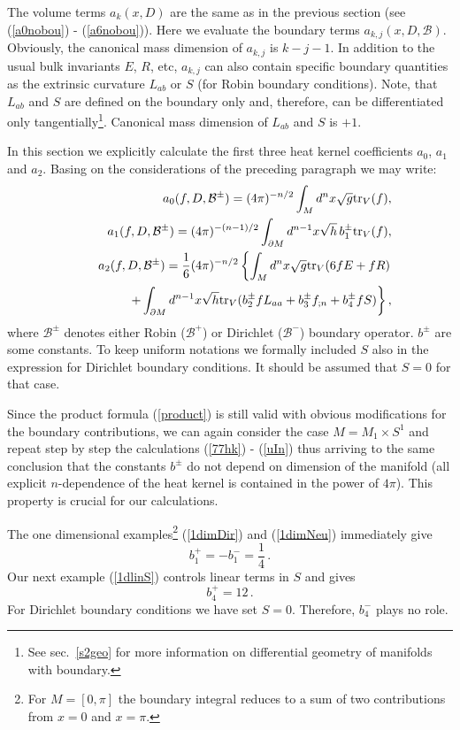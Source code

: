 The volume terms $a_k(x,D)$ are the same as in the previous section
(see (\ref{a0nobou}) - (\ref{a6nobou})). Here we evaluate the
boundary terms $a_{k,j}(x,D,\mathcal{B})$. Obviously, the canonical
mass dimension of $a_{k,j}$ is $k-j-1$. In addition to the usual bulk
invariants $E$, $R$, etc, $a_{k,j}$ can also contain specific boundary
quantities as the extrinsic curvature $L_{ab}$ or $S$ (for Robin
boundary conditions). Note, that $L_{ab}$ and $S$ are defined on the
boundary only and, therefore, can be differentiated only 
tangentially\footnote{See sec.\ \ref{s2geo} for more information on
differential geometry of manifolds with boundary.}. Canonical mass dimension
of $L_{ab}$ and $S$ is $+1$.

In this section we explicitly calculate the first three heat kernel
coefficients $a_0$, $a_1$ and $a_2$. Basing on the considerations of the
preceding paragraph we may write:
\begin{eqnarray}
&&a_0(f,D,\mathcal{ B}^\pm)=(4\pi)^{-n/2}\int_M d^nx\sqrt{g} {\rm tr}_V(f),\label{a0DN} \\
&&a_1(f,D,\mathcal{ B}^\pm)=(4\pi)^{-(n-1)/2}\int_{\partial M} d^{n-1}x\sqrt{h} \, b_1^\pm
     {\rm tr}_V ( f), \label{a1DN} \\
&&a_2(f,D,\mathcal{ B}^\pm)=\frac 16 (4\pi)^{-n/2}\left\{ \int_M d^nx\sqrt{g}
     {\rm tr}_V(6fE+fR) \right. \nonumber \\
&&\qquad\qquad \left. +\int_{\partial M} d^{n-1}x\sqrt{h} {\rm tr}_V(b_2^\pm fL_{ aa}
     +b_3^\pm f_{ ;n}+b_4^\pm fS)
     \right\} ,\label{a2DN}
\end{eqnarray}   
where $\mathcal{B}^\pm$ denotes either Robin ($\mathcal{B}^+$) or
Dirichlet ($\mathcal{B}^-$) boundary operator. $b^\pm$ are some
constants. To keep uniform notations we formally included $S$ also in the
expression for Dirichlet boundary conditions. It should be assumed
that $S=0$ for that case.

Since the product 
formula (\ref{product}) is still valid with obvious modifications
for the boundary contributions, we can again consider the
case $M=M_1\times S^1$ and repeat step by step the calculations
(\ref{77hk}) - (\ref{uIn}) thus arriving to the same conclusion that
the constants $b^\pm$ do not depend on dimension of the manifold
(all explicit $n$-dependence of the heat kernel is contained in the power
of $4\pi$). This property is crucial for our calculations.

The one dimensional examples\footnote{For $M=[0,\pi ]$ the boundary
integral reduces to a sum of two contributions from $x=0$ and $x=\pi$.}
(\ref{1dimDir}) and (\ref{1dimNeu}) immediately give
\begin{equation}
b_1^+=-b_1^-=\frac 14 \,.\label{b1pm}
\end{equation}
Our next example (\ref{1dlinS}) controls linear terms in $S$ and
gives
\begin{equation}
b_4^+=12 \,.\label{b4p}
\end{equation}
For Dirichlet boundary conditions we have set $S=0$. Therefore,
$b_4^-$ plays no role.

